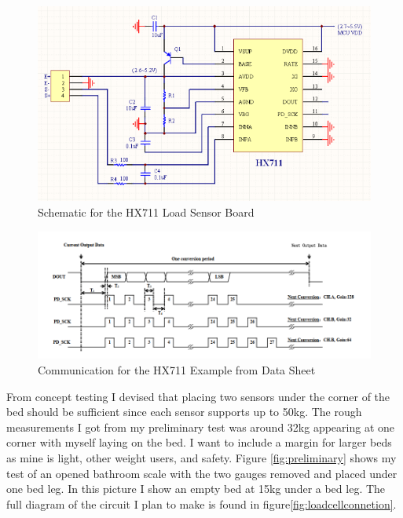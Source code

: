 \documentclass[11pt]{article}
\begin{document}
\begin{figure}[H]
	\centering
	\includegraphics[width = 0.7\linewidth]{HX711}
	\caption{Schematic for the HX711 Load Sensor Board}
	\label{fig:HX711}
\end{figure}
\begin{figure}[H]
	\centering
	\includegraphics[width = 0.8\linewidth]{exampleDatashaeet}
	\caption{Communication for the HX711 Example from Data Sheet}
	\label{fig:hx711Communication}
\end{figure}
\newpage
From concept testing I devised that placing two sensors under the corner of the bed should be sufficient since each sensor supports up to 50kg. 
The rough measurements I got from my preliminary test was around 32kg appearing at one corner with myself laying on the bed.
I want to include a margin for larger beds as mine is light, other weight users, and safety.
Figure \ref{fig:preliminary} shows my test of an opened bathroom scale with the two gauges removed and placed under one bed leg. 
In this picture I show an empty bed at 15kg under a bed leg. 
The full diagram of the circuit I plan to make is found in figure\ref{fig:loadcellconnetion}.
\end{document}
